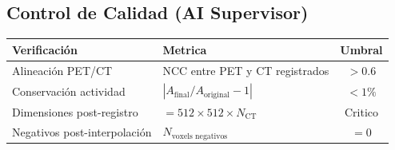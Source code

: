 \documentclass[12pt,a4paper]{article}
\begin{document}
\begin{tcolorbox}[aiSupervisor]
\subsection*{Control de Calidad (AI Supervisor)}

\begin{table}[H]
\centering
\begin{tabular}{llc}
\toprule
\textbf{Verificación} & \textbf{Metrica} & \textbf{Umbral} \\
\midrule
Alineación PET/CT & NCC entre PET y CT registrados & $> 0.6$ \\
Conservación actividad & $|A_{\text{final}}/A_{\text{original}} - 1|$ & $< 1\%$ \\
Dimensiones post-registro & $= 512 \times 512 \times N_{\text{CT}}$ & Critico \\
Negativos post-interpolación & $N_{\text{voxels negativos}}$ & $= 0$ \\
\bottomrule
\end{tabular}
\end{table}

\newpage


\newpage


\newpage


\newpage


\newpage


\newpage


\newpage


\newpage

\end{tcolorbox}
\end{document}
